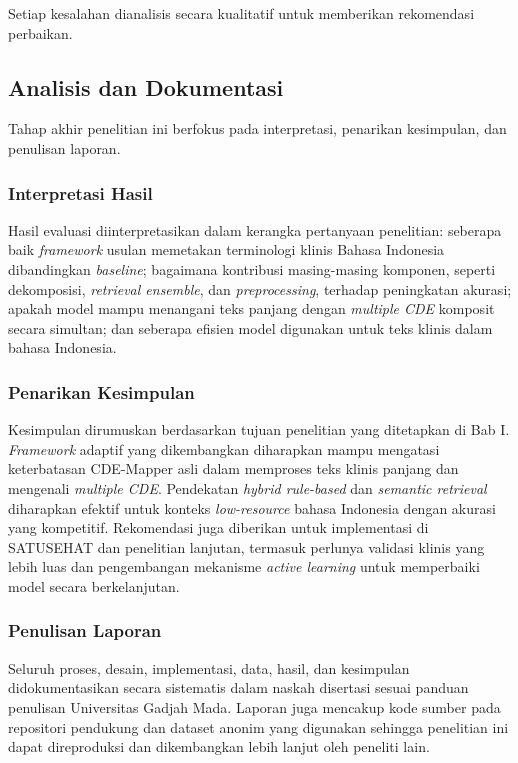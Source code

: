 Setiap kesalahan dianalisis secara kualitatif untuk memberikan rekomendasi perbaikan.

\subsection{Analisis dan Dokumentasi}

Tahap akhir penelitian ini berfokus pada interpretasi, penarikan kesimpulan, dan penulisan laporan.

\subsubsection{Interpretasi Hasil}

Hasil evaluasi diinterpretasikan dalam kerangka pertanyaan penelitian: seberapa baik \textit{framework} usulan memetakan terminologi klinis Bahasa Indonesia dibandingkan \textit{baseline}; bagaimana kontribusi masing-masing komponen, seperti dekomposisi, \textit{retrieval ensemble}, dan \textit{preprocessing}, terhadap peningkatan akurasi; apakah model mampu menangani teks panjang dengan \textit{multiple CDE} komposit secara simultan; dan seberapa efisien model digunakan untuk teks klinis dalam bahasa Indonesia.

\subsubsection{Penarikan Kesimpulan}

Kesimpulan dirumuskan berdasarkan tujuan penelitian yang ditetapkan di Bab I. \textit{Framework} adaptif yang dikembangkan diharapkan mampu mengatasi keterbatasan CDE-Mapper asli dalam memproses teks klinis panjang dan mengenali \textit{multiple CDE}. Pendekatan \textit{hybrid rule-based} dan \textit{semantic retrieval} diharapkan efektif untuk konteks \textit{low-resource} bahasa Indonesia dengan akurasi yang kompetitif. Rekomendasi juga diberikan untuk implementasi di SATUSEHAT dan penelitian lanjutan, termasuk perlunya validasi klinis yang lebih luas dan pengembangan mekanisme \textit{active learning} untuk memperbaiki model secara berkelanjutan.

\subsubsection{Penulisan Laporan}

Seluruh proses, desain, implementasi, data, hasil, dan kesimpulan didokumentasikan secara sistematis dalam naskah disertasi sesuai panduan penulisan Universitas Gadjah Mada. Laporan juga mencakup kode sumber pada repositori pendukung dan dataset anonim yang digunakan sehingga penelitian ini dapat direproduksi dan dikembangkan lebih lanjut oleh peneliti lain.

